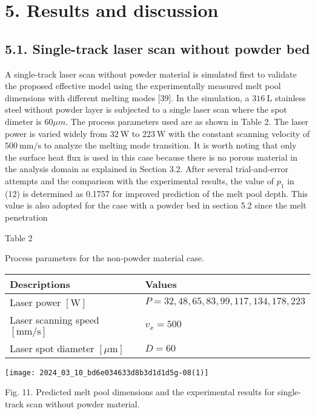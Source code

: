 \documentclass[10pt]{article}
\begin{document}
\section*{5. Results and discussion}
\subsection*{5.1. Single-track laser scan without powder bed}
A single-track laser scan without powder material is simulated first to validate the proposed effective model using the experimentally measured melt pool dimensions with different melting modes [39]. In the simulation, a $316 \mathrm{~L}$ stainless steel without powder layer is subjected to a single laser scan where the spot dimeter is $60 \mu m$. The process parameters used are as shown in Table 2. The laser power is varied widely from $32 \mathrm{~W}$ to $223 \mathrm{~W}$ with the constant scanning velocity of $500 \mathrm{~mm} / \mathrm{s}$ to analyze the melting mode transition. It is worth noting that only the surface heat flux is used in this case because there is no porous material in the analysis domain as explained in Section 3.2. After several trial-and-error attempts and the comparison with the experimental results, the value of $p_{1}$ in (12) is determined as 0.1757 for improved prediction of the melt pool depth. This value is also adopted for the case with a powder bed in section 5.2 since the melt penetration

Table 2

Process parameters for the non-powder material case.

\begin{center}
\begin{tabular}{ll}
\hline
Descriptions & Values \\
\hline
Laser power $[\mathrm{W}]$ & $P=32,48,65,83,99,117,134,178,223$ \\
Laser scanning speed $[\mathrm{mm} / \mathrm{s}]$ & $v_{x}=500$ \\
Laser spot diameter $[\mu \mathrm{m}]$ & $D=60$ \\
\hline
\end{tabular}
\end{center}

\begin{center}
\texttt{[image: 2024\_03\_10\_bd6e034633d8b3d1d1d5g-08(1)]}
\end{center}

Fig. 11. Predicted melt pool dimensions and the experimental results for single-track scan without powder material.
\end{document}
